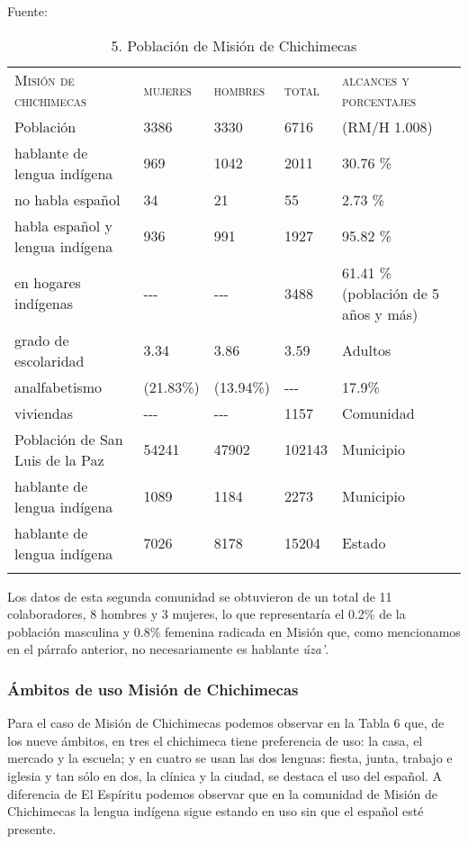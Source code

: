 \documentclass[output=paper]{../langscibook}
\begin{document}
\begin{table}
\caption{\label{tab:guerrero}5. Población de Misión de Chichimecas}
Fuente: \citet{INEGI2010}

\begin{tabularx}{\textwidth}{XXXXX}
\lsptoprule
{\textsc{Misión} \textsc{de} \textsc{chichimecas}} & {\textsc{mujeres}} & {\textsc{hombres}} & {\textsc{total}} & {\textsc{alcances} \textsc{y} \textsc{porcentajes}}\\
{Población} & {3386} & {3330} & {6716} & {(RM/H 1.008)}\\
{hablante de lengua indígena} & {969} & {1042} & {2011} & {30.76 \%}\\
{no habla español} & {34} & {21} & {55} & {2.73 \%}\\
{habla español y lengua indígena} & {936} & {991} & {1927} & {95.82 \%}\\
{en hogares indígenas} & {{}-{}-{}-} & {{}-{}-{}-} & {3488} & {61.41 \% (población de 5 años y más)}\\
{grado de escolaridad} & {3.34} & {3.86} & {3.59}  & {Adultos}\\
{analfabetismo} & {(21.83\%)} & {(13.94\%)} & {{}-{}-{}-} & {17.9\%}\\
{viviendas} & {{}-{}-{}-} & {{}-{}-{}-} & {1157} & {Comunidad}\\
{Población de San Luis de la Paz} & {54241} & {47902} & {102143} & {Municipio}\\
{hablante de lengua indígena} & {1089} & {1184} & {2273} & {Municipio}\\
{hablante de lengua indígena} & {7026} & {8178} & {15204} & {Estado}\\
\lspbottomrule
\end{tabularx}
\end{table}

Los datos de esta segunda comunidad se obtuvieron de un total de 11 colaboradores, 8 hombres y 3 mujeres, lo que representaría el 0.2\% de la población masculina y 0.8\% femenina radicada en Misión que, como mencionamos en el párrafo anterior, no necesariamente es hablante \textit{úza’}.


 \subsubsection{Ámbitos de uso Misión de Chichimecas}


Para el caso de Misión de Chichimecas podemos observar en la Tabla 6 que, de los nueve ámbitos, en tres el chichimeca tiene preferencia de uso: la casa, el mercado y la escuela; y en cuatro se usan las dos lenguas: fiesta, junta, trabajo e iglesia y tan sólo en dos, la clínica y la ciudad, se destaca el uso del español. A diferencia de El Espíritu podemos observar que en la comunidad de Misión de Chichimecas la lengua indígena sigue estando en uso sin que el español esté presente.
\end{document}
